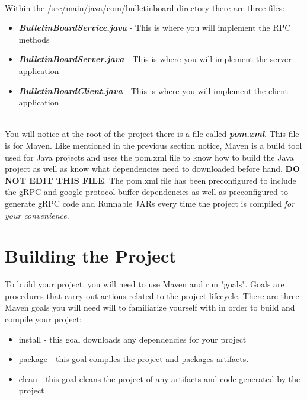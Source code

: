 \documentclass{article}
\begin{document}
\-\ \\Within the /src/main/java/com/bulletinboard directory there are three files:
\begin{itemize}
\item \textbf{\textit{BulletinBoardService.java}} - This is where you will implement the RPC methods
\item \textbf{\textit{BulletinBoardServer.java}} - This is where you will implement the server application
\item \textbf{\textit{BulletinBoardClient.java}} - This is where you will implement the client application\\\\
\end{itemize}
You will notice at the root of the project there is a file called \textbf{\textit{pom.xml}}. This file is for Maven. Like mentioned in the previous section notice, Maven is a build tool used for Java projects and uses the pom.xml file to know how to build the Java project as well as know what dependencies need to downloaded before hand. \textbf{DO NOT EDIT THIS FILE}. The pom.xml file has been preconfigured to include the gRPC and google protocol buffer dependencies as well as preconfigured to generate gRPC code and Runnable JARs every time the project is compiled \textit{for your convenience}. 





\section{Building the Project} %
To build your project, you will need to use Maven and run "goals". Goals are procedures that carry out actions related to the project lifecycle. There are three Maven goals you will need will to familiarize yourself with in order to build and compile your project:
\begin{itemize}
\item install - this goal downloads any dependencies for your project
\item package - this goal compiles the project and packages artifacts.
\item clean - this goal cleans the project of any artifacts and code generated by the project
\end{itemize}
\end{document}
